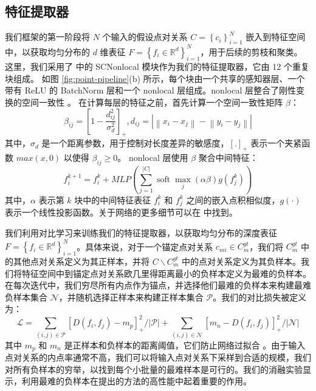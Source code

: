 \subsection{特征提取器}\label{sec:feature_extr}
我们框架的第一阶段将 $N$ 个输入的假设点对关系 $C=\left\{c_{i}\right\}_{i=1}^{N}$ 嵌入到特征空间中，以获取均匀分布的 $d$ 维表征 $F=\left\{f_{i} \in \mathbb{R}^{d}\right\}_{i=1}^{N}$，用于后续的剪枝和聚类。
这里，我们采用了 \cite{bai2021pointdsc} 中的 SCNonlocal 模块作为我们的特征提取器，它由 12 个重复块组成。
如图 \ref{fig:point-pipeline}(b) 所示，每个块由一个共享的感知器层、一个带有 ReLU 的 BatchNorm 层和一个 nonlocal 层组成。nonlocal 层整合了刚性变换的空间一致性 \cite{leordeanu2005spectral} 。
在计算每层的特征之前，首先计算一个空间一致性矩阵 $\beta$：
\begin{equation}
  \beta_{i j}=\left[1-\frac{d_{i j}^{2}}{\sigma_{d}^{2}}\right]_{+}, d_{i j}=\left|\left\|x_{i}-x_{j}\right\|-\left\|y_{i}-y_{j}\right\|\right|
\end{equation}
其中，$\sigma_{d}$ 是一个距离参数，用于控制对长度差异的敏感度，$[.]_+$ 表示一个夹紧函数 $max(x,0)$ 以使得 $\beta_{ij} \geq 0$。
nonlocal 层使用 $\beta$ 聚合中间特征：
\begin{equation}
  f_{i}^{k+1}=f_{i}^{k}+M L P\left(\sum_{j=1}^{|C|} \operatorname{soft} \max _{j}(\alpha \beta) g\left(f_{j}^{k}\right)\right)
\end{equation}
其中，$\alpha$ 表示第 $k$ 块中的中间特征表征 $f_i^k$ 和 $f_j^k$ 之间的嵌入点积相似度，$g(\cdot)$ 表示一个线性投影函数。关于网络的更多细节可以在 \cite{bai2021pointdsc} 中找到。

我们利用对比学习来训练我们的特征提取器，以获取均匀分布的深度表征 $F=\left\{f_{i} \in \mathbb{R}^{d}\right\}_{i=1}^{N}$。具体来说，对于一个锚定点对关系 $c_{m i} \in C_{m}^{g t}$，我们将 $C_m^{gt}$ 中的其他点对关系定义为其正样本，并将 $C \backslash C_{m}^{g t}$ 中的点对关系定义为其负样本。我们将特征空间中到锚定点对关系欧几里得距离最小的负样本定义为最难的负样本。在每次迭代中，我们穷尽所有内点作为锚点，并选择他们最难的负样本来构建最难负样本集合 $\mathcal{N}$，并随机选择正样本来构建正样本集合 $\mathcal{P}$。我们的对比损失被定义为：
\begin{equation}
  \mathcal{L}=\sum_{(i, j) \in \mathcal{P}}\left[D\left(f_{i}, f_{j}\right)-m_{p}\right]_{+}^{2} /|\mathcal{P}|+\sum_{(i, j) \in \mathcal{N}}\left[m_{n}-D\left(f_{i}, f_{j}\right)\right]_{+}^{2} /|\mathcal{N}|
  \label{loss}
\end{equation}
其中 $m_p$ 和 $m_n$ 是正样本和负样本的距离阈值，它们防止网络过拟合 \cite{lin2015Deephash}。由于输入点对关系的内点率通常不高，我们可以将输入点对关系下采样到合适的规模，我们对所有负样本的穷举，以找到每个小批量的最难样本是可行的。我们的消融实验显示，利用最难的负样本在提出的方法的高性能中起着重要的作用。

